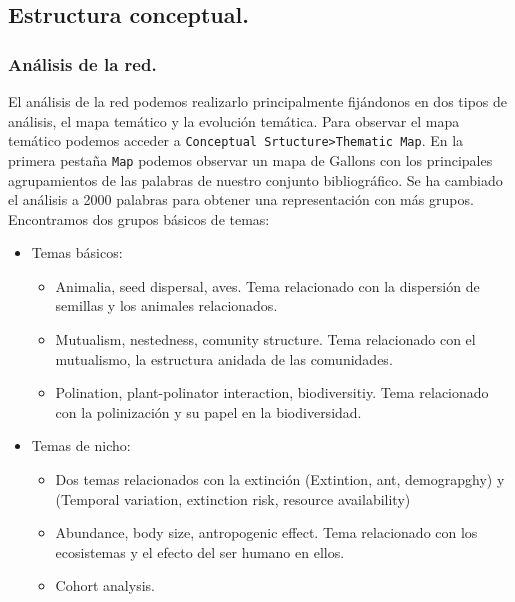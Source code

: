 \documentclass[
]{article}
\providecommand{\tightlist}{%
  \setlength{\itemsep}{0pt}\setlength{\parskip}{0pt}}
\begin{document}
\hypertarget{estructura-conceptual.}{%
\subsection{Estructura conceptual.}\label{estructura-conceptual.}}

\hypertarget{anuxe1lisis-de-la-red.}{%
\subsubsection{Análisis de la red.}\label{anuxe1lisis-de-la-red.}}

El análisis de la red podemos realizarlo principalmente fijándonos en
dos tipos de análisis, el mapa temático y la evolución temática. Para
observar el mapa temático podemos acceder a
\texttt{Conceptual\ Srtucture\textgreater{}Thematic\ Map}. En la primera
pestaña \texttt{Map} podemos observar un mapa de Gallons con los
principales agrupamientos de las palabras de nuestro conjunto
bibliográfico. Se ha cambiado el análisis a 2000 palabras para obtener
una representación con más grupos. Encontramos dos grupos básicos de
temas:

\begin{itemize}
\tightlist
\item
  Temas básicos:

  \begin{itemize}
  \tightlist
  \item
    Animalia, seed dispersal, aves. Tema relacionado con la dispersión
    de semillas y los animales relacionados.
  \item
    Mutualism, nestedness, comunity structure. Tema relacionado con el
    mutualismo, la estructura anidada de las comunidades.
  \item
    Polination, plant-polinator interaction, biodiversitiy. Tema
    relacionado con la polinización y su papel en la biodiversidad.
  \end{itemize}
\item
  Temas de nicho:

  \begin{itemize}
  \tightlist
  \item
    Dos temas relacionados con la extinción (Extintion, ant,
    demograpghy) y (Temporal variation, extinction risk, resource
    availability)
  \item
    Abundance, body size, antropogenic effect. Tema relacionado con los
    ecosistemas y el efecto del ser humano en ellos.
  \item
    Cohort analysis.
  \end{itemize}
\end{itemize}
\end{document}
